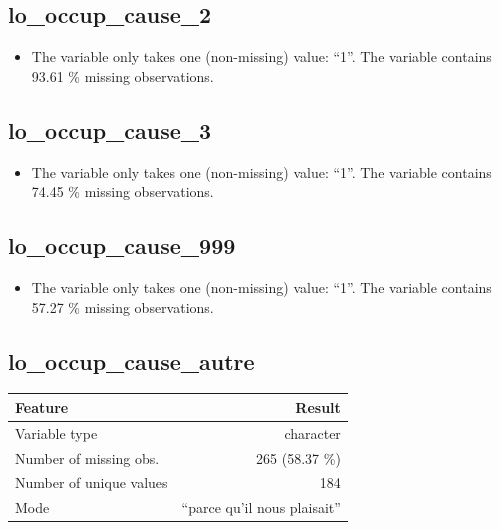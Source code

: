 \documentclass[
  letterpaper,
  DIV=11,
  numbers=noendperiod]{scrartcl}
\providecommand{\tightlist}{%
  \setlength{\itemsep}{0pt}\setlength{\parskip}{0pt}}
\begin{document}
\fullline

\subsection{lo\_occup\_cause\_2}\label{lo_occup_cause_2}

\begin{itemize}
\tightlist
\item
  The variable only takes one (non-missing) value: ``1''. The variable
  contains 93.61 \% missing observations.
\end{itemize}

\fullline

\subsection{lo\_occup\_cause\_3}\label{lo_occup_cause_3}

\begin{itemize}
\tightlist
\item
  The variable only takes one (non-missing) value: ``1''. The variable
  contains 74.45 \% missing observations.
\end{itemize}

\fullline

\subsection{lo\_occup\_cause\_999}\label{lo_occup_cause_999}

\begin{itemize}
\tightlist
\item
  The variable only takes one (non-missing) value: ``1''. The variable
  contains 57.27 \% missing observations.
\end{itemize}

\fullline

\subsection{lo\_occup\_cause\_autre}\label{lo_occup_cause_autre}

\bminione

\begin{longtable}[]{@{}lr@{}}
\toprule\noalign{}
Feature & Result \\
\midrule\noalign{}
\endhead
\bottomrule\noalign{}
\endlastfoot
Variable type & character \\
Number of missing obs. & 265 (58.37 \%) \\
Number of unique values & 184 \\
Mode & ``parce qu'il nous plaisait'' \\
\end{longtable}
\end{document}
